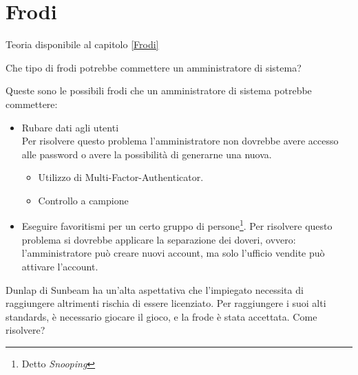 \chapter{Frodi}
\label{EsFrodi}

Teoria disponibile al capitolo \ref{Frodi}

\begin{Exercise} [
  title={Frodi di un amministratore di sistema},
  label={fr1}
 ]

 \Question Che tipo di frodi potrebbe commettere un amministratore di sistema?

\end{Exercise}

\begin{Answer} [
   ref={fr1},
   number={1}
 ]

  \Question Queste sono le possibili frodi che un amministratore di sistema
potrebbe commettere:
\begin{itemize}
  \item Rubare dati agli utenti \\
  Per risolvere questo problema l'amministratore non dovrebbe avere accesso
alle password o avere la possibilità di generarne una nuova.
  \begin{itemize}
   \item Utilizzo di Multi-Factor-Authenticator.
   \item Controllo a campione
  \end{itemize}

  \item Eseguire favoritismi per un certo gruppo di
persone\footnote{Detto \textit{Snooping}}.
  Per risolvere questo problema si dovrebbe applicare la separazione dei
doveri, ovvero: l'amministratore può creare nuovi account, ma solo l'ufficio
vendite può attivare l'account.
\end{itemize}

\end{Answer}


\begin{Exercise} [
  title={Frode su obiettivi},
  label={fr2}
 ]

 Dunlap di Sunbeam ha un'alta aspettativa che l'impiegato necessita di
raggiungere altrimenti rischia di essere licenziato. Per raggiungere i suoi
alti standards, è necessario giocare il gioco, e la frode è stata accettata.
  \Question Come risolvere?

\end{Exercise}

